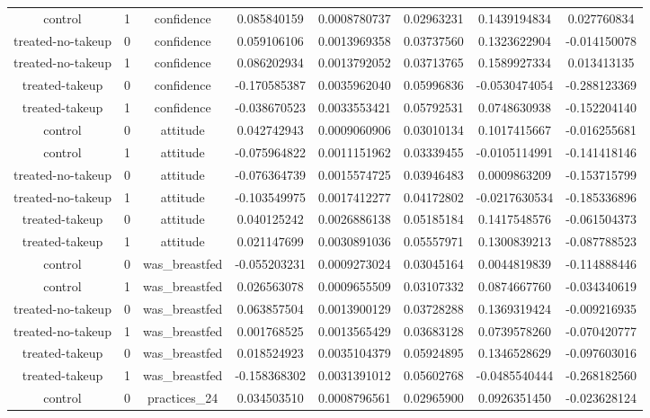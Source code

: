 \begin{table}[!htbp]
\begin{tabular}{@{\extracolsep{5pt}} cccccccc}
control & 1 & confidence &  0.085840159 & 0.0008780737 & 0.02963231 &  0.1439194834 &  0.027760834 \\ 
treated-no-takeup & 0 & confidence &  0.059106106 & 0.0013969358 & 0.03737560 &  0.1323622904 & -0.014150078 \\ 
treated-no-takeup & 1 & confidence &  0.086202934 & 0.0013792052 & 0.03713765 &  0.1589927334 &  0.013413135 \\ 
treated-takeup & 0 & confidence & -0.170585387 & 0.0035962040 & 0.05996836 & -0.0530474054 & -0.288123369 \\ 
treated-takeup & 1 & confidence & -0.038670523 & 0.0033553421 & 0.05792531 &  0.0748630938 & -0.152204140 \\ 
control & 0 & attitude &  0.042742943 & 0.0009060906 & 0.03010134 &  0.1017415667 & -0.016255681 \\ 
control & 1 & attitude & -0.075964822 & 0.0011151962 & 0.03339455 & -0.0105114991 & -0.141418146 \\ 
treated-no-takeup & 0 & attitude & -0.076364739 & 0.0015574725 & 0.03946483 &  0.0009863209 & -0.153715799 \\ 
treated-no-takeup & 1 & attitude & -0.103549975 & 0.0017412277 & 0.04172802 & -0.0217630534 & -0.185336896 \\ 
treated-takeup & 0 & attitude &  0.040125242 & 0.0026886138 & 0.05185184 &  0.1417548576 & -0.061504373 \\ 
treated-takeup & 1 & attitude &  0.021147699 & 0.0030891036 & 0.05557971 &  0.1300839213 & -0.087788523 \\ 
control & 0 & was\_breastfed & -0.055203231 & 0.0009273024 & 0.03045164 &  0.0044819839 & -0.114888446 \\ 
control & 1 & was\_breastfed &  0.026563078 & 0.0009655509 & 0.03107332 &  0.0874667760 & -0.034340619 \\ 
treated-no-takeup & 0 & was\_breastfed &  0.063857504 & 0.0013900129 & 0.03728288 &  0.1369319424 & -0.009216935 \\ 
treated-no-takeup & 1 & was\_breastfed &  0.001768525 & 0.0013565429 & 0.03683128 &  0.0739578260 & -0.070420777 \\ 
treated-takeup & 0 & was\_breastfed &  0.018524923 & 0.0035104379 & 0.05924895 &  0.1346528629 & -0.097603016 \\ 
treated-takeup & 1 & was\_breastfed & -0.158368302 & 0.0031391012 & 0.05602768 & -0.0485540444 & -0.268182560 \\ 
control & 0 & practices\_24 &  0.034503510 & 0.0008796561 & 0.02965900 &  0.0926351450 & -0.023628124 \\ 

\end{tabular}
\end{table}
